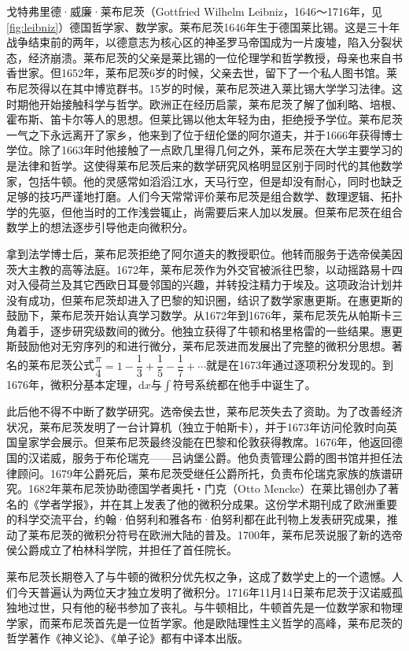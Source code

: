 \documentclass[b5paper]{ctexart}
\begin{document}
\begin{mdframed}
戈特弗里德·威廉·莱布尼茨（Gottfried Wilhelm Leibniz，1646～1716年，见\cref{fig:leibniz}）德国哲学家、数学家。莱布尼茨1646年生于德国莱比锡。这是三十年战争结束前的两年，以德意志为核心区的神圣罗马帝国成为一片废墟，陷入分裂状态，经济崩溃。莱布尼茨的父亲是莱比锡的一位伦理学和哲学教授，母亲也来自书香世家。但1652年，莱布尼茨6岁的时候，父亲去世，留下了一个私人图书馆。莱布尼茨得以在其中博览群书。15岁的时候，莱布尼茨进入莱比锡大学学习法律。这时期他开始接触科学与哲学。欧洲正在经历启蒙，莱布尼茨了解了伽利略、培根、霍布斯、笛卡尔等人的思想。但莱比锡以他太年轻为由，拒绝授予学位。莱布尼茨一气之下永远离开了家乡，他来到了位于纽伦堡的阿尔道夫，并于1666年获得博士学位。除了1663年时他接触了一点欧几里得几何之外，莱布尼茨在大学主要学习的是法律和哲学。这使得莱布尼茨后来的数学研究风格明显区别于同时代的其他数学家，包括牛顿。他的灵感常如滔滔江水，天马行空，但是却没有耐心，同时也缺乏足够的技巧严谨地打磨。人们今天常常评价莱布尼茨是组合数学、数理逻辑、拓扑学的先驱，但他当时的工作浅尝辄止，尚需要后来人加以发展。但莱布尼茨在组合数学上的想法逐步引导他走向微积分。

拿到法学博士后，莱布尼茨拒绝了阿尔道夫的教授职位。他转而服务于选帝侯美因茨大主教的高等法庭。1672年，莱布尼茨作为外交官被派往巴黎，以动摇路易十四对入侵荷兰及其它西欧日耳曼邻国的兴趣，并转投注精力于埃及。这项政治计划并没有成功，但莱布尼茨却进入了巴黎的知识圈，结识了数学家惠更斯。在惠更斯的鼓励下，莱布尼茨开始认真学习数学。从1672年到1676年，莱布尼茨先从帕斯卡三角着手，逐步研究级数间的微分。他独立获得了牛顿和格里格雷的一些结果。惠更斯鼓励他对无穷序列的和进行微分，莱布尼茨进而发展出了完整的微积分思想。著名的莱布尼茨公式$\dfrac{\pi}{4} = 1 - \dfrac{1}{3} + \dfrac{1}{5} - \dfrac{1}{7} + \dotsb$就是在1673年通过逐项积分发现的。到1676年，微积分基本定理，$\mathrm{d} x$与$\int$符号系统都在他手中诞生了。

此后他不得不中断了数学研究。选帝侯去世，莱布尼茨失去了资助。为了改善经济状况，莱布尼茨发明了一台计算机（独立于帕斯卡），并于1673年访问伦敦时向英国皇家学会展示。但莱布尼茨最终没能在巴黎和伦敦获得教席。1676年，他返回德国的汉诺威，服务于布伦瑞克——吕讷堡公爵。他负责管理公爵的图书馆并担任法律顾问。1679年公爵死后，莱布尼茨受继任公爵所托，负责布伦瑞克家族的族谱研究。1682年莱布尼茨协助德国学者奥托・门克（Otto Mencke）在莱比锡创办了著名的《学者学报》，并在其上发表了他的微积分成果。这份学术期刊成了欧洲重要的科学交流平台，约翰·伯努利和雅各布·伯努利都在此刊物上发表研究成果，推动了莱布尼茨的微积分符号在欧洲大陆的普及。1700年，莱布尼茨说服了新的选帝侯公爵成立了柏林科学院，并担任了首任院长。

莱布尼茨长期卷入了与牛顿的微积分优先权之争，这成了数学史上的一个遗憾。人们今天普遍认为两位天才独立发明了微积分。1716年11月14日莱布尼茨于汉诺威孤独地过世，只有他的秘书参加了丧礼。与牛顿相比，牛顿首先是一位数学家和物理学家，而莱布尼茨首先是一位哲学家。他是欧陆理性主义哲学的高峰，莱布尼茨的哲学著作《神义论》、《单子论》都有中译本出版。
\end{mdframed}
\end{document}
